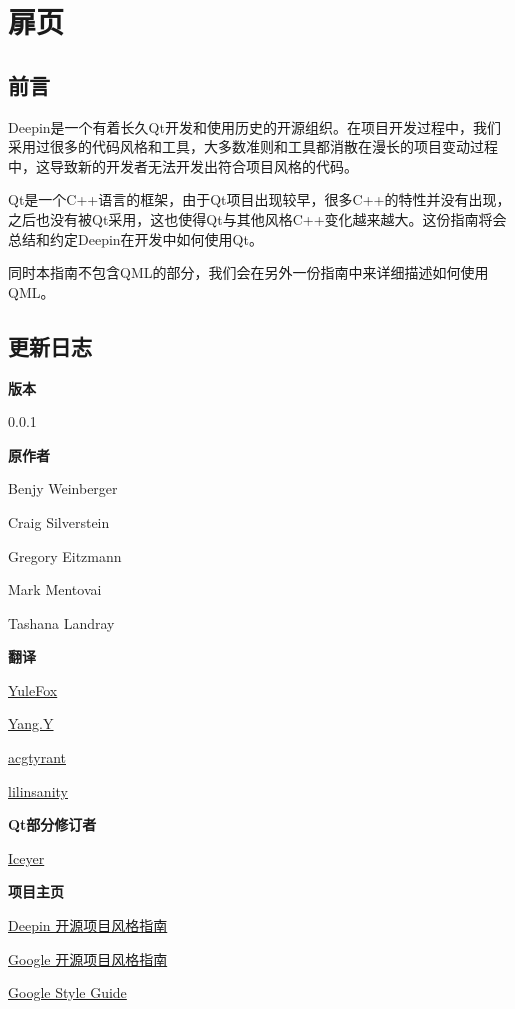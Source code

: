 \chapter{扉页}

\section{前言}

Deepin是一个有着长久Qt开发和使用历史的开源组织。在项目开发过程中，我们采用过很多的代码风格和工具，大多数准则和工具都消散在漫长的项目变动过程中，这导致新的开发者无法开发出符合项目风格的代码。

Qt是一个C++语言的框架，由于Qt项目出现较早，很多C++的特性并没有出现，之后也没有被Qt采用，这也使得Qt与其他风格C++变化越来越大。这份指南将会总结和约定Deepin在开发中如何使用Qt。

同时本指南不包含QML的部分，我们会在另外一份指南中来详细描述如何使用QML。

\section{更新日志}

\textbf{版本}

0.0.1

\textbf{原作者}

Benjy Weinberger

Craig Silverstein

Gregory Eitzmann

Mark Mentovai

Tashana Landray

\textbf{翻译}

\href{http://www.yulefox.com}{YuleFox}

\href{https://github.com/yangyubo}{Yang.Y}

\href{http://acgtyrant.com}{acgtyrant}

\href{http://github.com/lilinsanity}{lilinsanity}

\textbf{Qt部分修订者}

\href{https://blog.iceyer.net}{Iceyer}

\textbf{项目主页}

\href{https://gitlab.deepin.org/styleguide}{Deepin 开源项目风格指南}

\href{https://github.com/zh-google-styleguide/zh-google-styleguide}{Google 开源项目风格指南}

\href{https://github.com/google/styleguide}{Google Style Guide}


